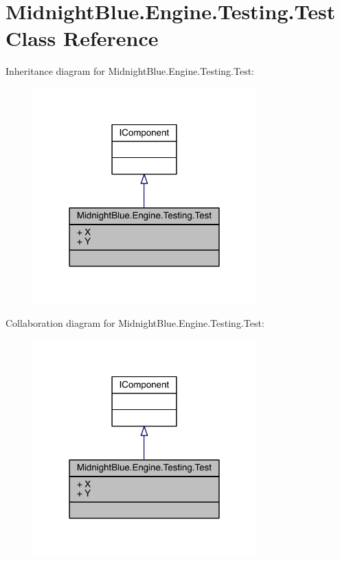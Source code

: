 \hypertarget{class_midnight_blue_1_1_engine_1_1_testing_1_1_test}{}\section{Midnight\+Blue.\+Engine.\+Testing.\+Test Class Reference}
\label{class_midnight_blue_1_1_engine_1_1_testing_1_1_test}


Inheritance diagram for Midnight\+Blue.\+Engine.\+Testing.\+Test\+:
\nopagebreak
\begin{figure}[H]
\begin{center}
\leavevmode
\includegraphics[width=243pt]{class_midnight_blue_1_1_engine_1_1_testing_1_1_test__inherit__graph}
\end{center}
\end{figure}


Collaboration diagram for Midnight\+Blue.\+Engine.\+Testing.\+Test\+:
\nopagebreak
\begin{figure}[H]
\begin{center}
\leavevmode
\includegraphics[width=243pt]{class_midnight_blue_1_1_engine_1_1_testing_1_1_test__coll__graph}
\end{center}
\end{figure}
